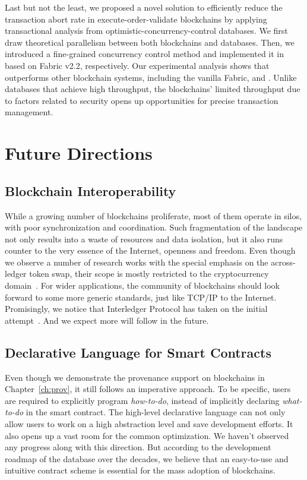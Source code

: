 Last but not the least, we proposed a novel solution to efficiently reduce the transaction abort rate in execute-order-validate blockchains by applying transactional
analysis from optimistic-concurrency-control databases. We first draw theoretical parallelism between both blockchains and databases. Then,
we introduced a fine-grained concurrency control method and
implemented it in {\fs} based on
Fabric v2.2, respectively. 
Our experimental analysis shows that {\fs} outperforms other blockchain systems, including the vanilla Fabric,
and {\fabricPlusplus}. Unlike databases that achieve high throughput, the blockchains’ limited throughput due to factors related to security opens up opportunities for precise transaction management.

\section{Future Directions}
\subsection{Blockchain Interoperability}
While a growing number of blockchains proliferate, most of them operate in silos, with poor synchronization and coordination. 
Such fragmentation of the landscape not only results into a waste of resources and data isolation, but it also runs counter to the very essence of the Internet, openness and freedom. 
Even though we observe a number of research works with the special emphasis on the across-ledger token swap, their scope is mostly restricted to the cryptocurrency domain~\cite{herlihy2018atomic,robinson2019atomic,zakhary2019atomic}. 
For wider applications, the community of blockchains should look forward to some more generic standards, just like TCP/IP to the Internet. 
Promisingly, we notice that Interledger Protocol has taken on the initial attempt~\cite{interledger}. And we expect more will follow in the future. 

\subsection{Declarative Language for Smart Contracts}
Even though we demonstrate the provenance support on blockchains in Chapter~\ref{ch:prov}, it still follows an imperative approach.
To be specific, users are required to explicitly program \textit{how-to-do}, instead of implicitly declaring \textit{what-to-do} in the smart contract. 
The high-level declarative language can not only allow users to work on a high abstraction level and save development efforts. 
It also opens up a vast room for the common optimization. 
We haven't observed any progress along with this direction.
But according to the development roadmap of the database over the decades, we believe that an easy-to-use and intuitive contract scheme is essential for the mass adoption of blockchains. 

